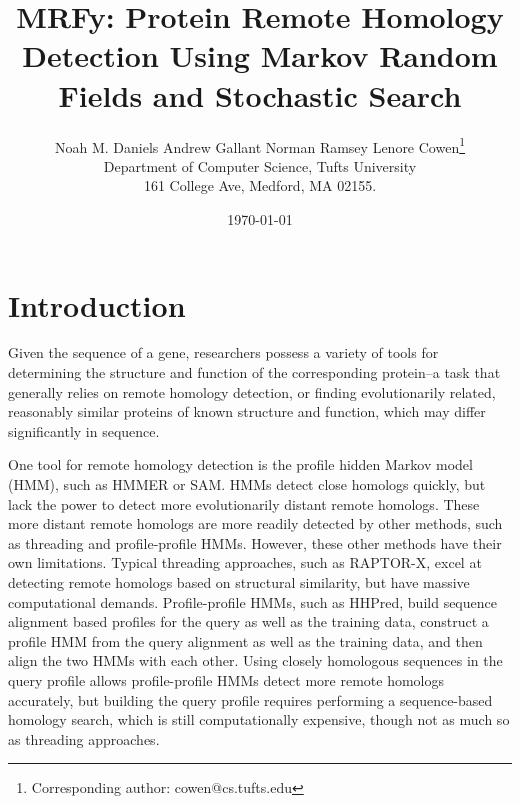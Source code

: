 \documentclass{acm_proc_article-sp}
\begin{document}
\title{MRFy: Protein Remote Homology Detection Using Markov Random Fields and
Stochastic Search}

\author{Noah M. Daniels \hspace*{8pt} Andrew Gallant \hspace*{8pt} Norman 
Ramsey \hspace*{8pt} 
Lenore Cowen\thanks{Corresponding author: cowen@cs.tufts.edu}
\\ Department of Computer Science, Tufts University \\ 161 College Ave, 
Medford, MA 02155.}

\date{\today}

\maketitle




\begin{abstract}


\end{abstract} 




\section{Introduction}

Given the sequence of a gene, researchers possess a variety of tools for 
determining the structure and function of the corresponding protein--a task 
that generally relies on remote homology detection, or finding evolutionarily 
related, reasonably similar proteins of known structure and function, which may 
differ significantly in sequence. 

One tool for remote homology detection is the profile hidden Markov model 
(HMM), such as HMMER or SAM. 
HMMs detect close homologs quickly, but lack the power to detect more 
evolutionarily distant remote homologs. 
These more distant remote homologs are more readily detected by other methods, 
such as threading and profile-profile HMMs.
However, these other methods have their own limitations. 
Typical threading approaches, such as RAPTOR-X, excel at detecting remote 
homologs based on structural similarity, but have massive computational 
demands.
Profile-profile HMMs, such as HHPred, build sequence alignment based profiles 
for the query as well as the training data, construct a profile HMM from the 
query alignment as well as the training data, and then align the two HMMs with 
each other.
Using closely homologous sequences in the query profile allows profile-profile 
HMMs detect more remote homologs accurately, but building the query profile 
requires performing a sequence-based homology search, which is still 
computationally expensive, though not as much so as threading approaches.
\end{document}
